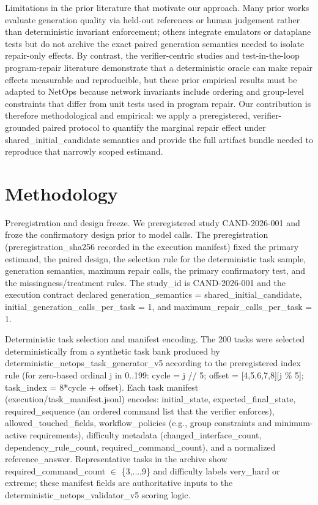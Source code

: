 \documentclass[conference]{IEEEtran}
\begin{document}
Limitations in the prior literature that motivate our approach. Many prior works evaluate generation quality via held-out references or human judgement rather than deterministic invariant enforcement; others integrate emulators or dataplane tests but do not archive the exact paired generation semantics needed to isolate repair-only effects. By contrast, the verifier-centric studies and test-in-the-loop program-repair literature demonstrate that a deterministic oracle can make repair effects measurable and reproducible, but these prior empirical results must be adapted to NetOps because network invariants include ordering and group-level constraints that differ from unit tests used in program repair. Our contribution is therefore methodological and empirical: we apply a preregistered, verifier-grounded paired protocol to quantify the marginal repair effect under shared\_initial\_candidate semantics and provide the full artifact bundle needed to reproduce that narrowly scoped estimand.

\section{Methodology}
Preregistration and design freeze. We preregistered study CAND-2026-001 and froze the confirmatory design prior to model calls. The preregistration (preregistration\_sha256 recorded in the execution manifest) fixed the primary estimand, the paired design, the selection rule for the deterministic task sample, generation semantics, maximum repair calls, the primary confirmatory test, and the missingness/treatment rules. The study\_id is CAND-2026-001 and the execution contract declared generation\_semantics = shared\_initial\_candidate, initial\_generation\_calls\_per\_task = 1, and maximum\_repair\_calls\_per\_task = 1.

Deterministic task selection and manifest encoding. The 200 tasks were selected deterministically from a synthetic task bank produced by deterministic\_netops\_task\_generator\_v5 according to the preregistered index rule (for zero-based ordinal j in 0..199: cycle = j // 5; offset = [4,5,6,7,8][j \% 5]; task\_index = 8*cycle + offset). Each task manifest (execution/task\_manifest.jsonl) encodes: initial\_state, expected\_final\_state, required\_sequence (an ordered command list that the verifier enforces), allowed\_touched\_fields, workflow\_policies (e.g., group constraints and minimum-active requirements), difficulty metadata (changed\_interface\_count, dependency\_rule\_count, required\_command\_count), and a normalized reference\_answer. Representative tasks in the archive show required\_command\_count \ensuremath{\in} \{3,...,9\} and difficulty labels very\_hard or extreme; these manifest fields are authoritative inputs to the deterministic\_netops\_validator\_v5 scoring logic.
\end{document}

